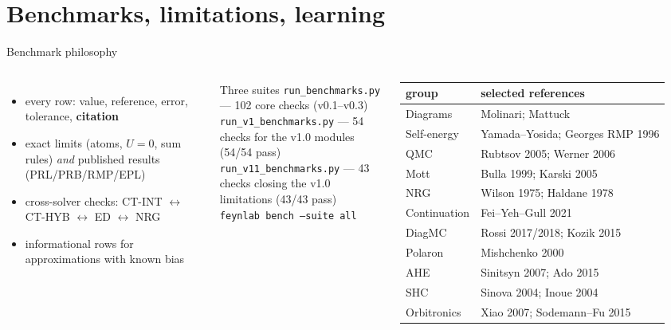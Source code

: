 \documentclass[aspectratio=169,10pt]{beamer}
\begin{document}
\section{Benchmarks, limitations, learning}
\begin{frame}{Benchmark philosophy}
\begin{columns}[T]
\begin{itemize}\small
 \item every row: value, reference, error, tolerance, \textbf{citation}
 \item exact limits (atoms, $U=0$, sum rules) \emph{and} published results (PRL/PRB/RMP/EPL)
 \item cross-solver checks: CT-INT $\leftrightarrow$ CT-HYB $\leftrightarrow$ ED $\leftrightarrow$ NRG
 \item informational rows for approximations with known bias
\end{itemize}
\begin{block}{Three suites}
\small
\texttt{run\_benchmarks.py} --- 102 core checks (v0.1--v0.3)\\
\texttt{run\_v1\_benchmarks.py} --- 54 checks for the v1.0 modules (54/54 pass)\\
\texttt{run\_v11\_benchmarks.py} --- 43 checks closing the v1.0 limitations (43/43 pass)\\
\texttt{feynlab bench --suite all}
\end{block}
\scriptsize
\begin{tabular}{ll}
\toprule
group & selected references\\\midrule
Diagrams & Molinari; Mattuck\\
Self-energy & Yamada--Yosida; Georges RMP 1996\\
QMC & Rubtsov 2005; Werner 2006\\
Mott & Bulla 1999; Karski 2005\\
NRG & Wilson 1975; Haldane 1978\\
Continuation & Fei--Yeh--Gull 2021\\
DiagMC & Rossi 2017/2018; Kozik 2015\\
Polaron & Mishchenko 2000\\
AHE & Sinitsyn 2007; Ado 2015\\
SHC & Sinova 2004; Inoue 2004\\
Orbitronics & Xiao 2007; Sodemann--Fu 2015\\
\bottomrule
\end{tabular}
\end{columns}
\end{frame}
\end{document}
